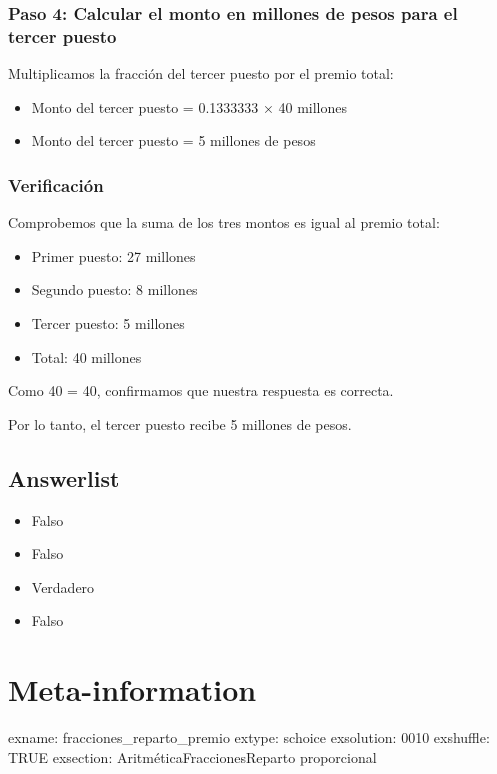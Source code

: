 \documentclass[
]{article}
\providecommand{\tightlist}{%
  \setlength{\itemsep}{0pt}\setlength{\parskip}{0pt}}
\begin{document}
\subsubsection{Paso 4: Calcular el monto en millones de pesos para el
tercer
puesto}\label{paso-4-calcular-el-monto-en-millones-de-pesos-para-el-tercer-puesto}

Multiplicamos la fracción del tercer puesto por el premio total:

\begin{itemize}
\tightlist
\item
  Monto del tercer puesto = 0.1333333 × 40 millones
\item
  Monto del tercer puesto = 5 millones de pesos
\end{itemize}

\subsubsection{Verificación}\label{verificaciuxf3n}

Comprobemos que la suma de los tres montos es igual al premio total:

\begin{itemize}
\tightlist
\item
  Primer puesto: 27 millones
\item
  Segundo puesto: 8 millones
\item
  Tercer puesto: 5 millones
\item
  Total: 40 millones
\end{itemize}

Como 40 = 40, confirmamos que nuestra respuesta es correcta.

Por lo tanto, el tercer puesto recibe 5 millones de pesos.

\subsection{Answerlist}\label{answerlist-1}

\begin{itemize}
\tightlist
\item
  Falso
\item
  Falso
\item
  Verdadero
\item
  Falso
\end{itemize}

\section{Meta-information}\label{meta-information}

exname: fracciones\_reparto\_premio extype: schoice exsolution: 0010
exshuffle: TRUE exsection: Aritmética\textbar Fracciones\textbar Reparto
proporcional
\end{document}
